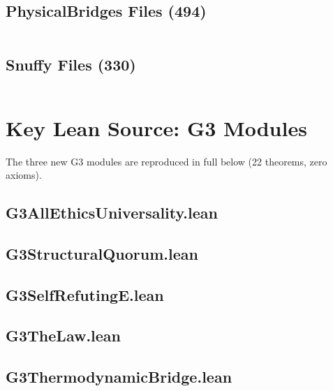 \documentclass[11pt,a4paper]{article}
\theoremstyle{definition}
\theoremstyle{remark}
\begin{document}
\subsection{PhysicalBridges Files (494)}

{\small\ttfamily
\begin{longtable}{p{}}

\end{longtable}
}

\subsection{Snuffy Files (330)}

{\small\ttfamily
\begin{longtable}{p{}}

\end{longtable}
}

\section{Key Lean Source: G3 Modules}
\label{app:g3-source}

The three new G3 modules are reproduced in full below (22 theorems, zero axioms).

\subsection{G3AllEthicsUniversality.lean}


\subsection{G3StructuralQuorum.lean}


\subsection{G3SelfRefutingE.lean}


\subsection{G3TheLaw.lean}


\subsection{G3ThermodynamicBridge.lean}

\end{document}
